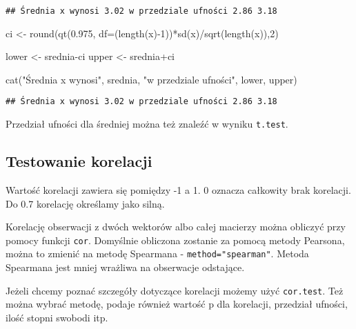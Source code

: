 \documentclass[
]{book}
\newenvironment{Shaded}{\begin{snugshade}}{\end{snugshade}}
\newcommand{\AttributeTok}[1]{\textcolor[rgb]{0.77,0.63,0.00}{#1}}
\newcommand{\DecValTok}[1]{\textcolor[rgb]{0.00,0.00,0.81}{#1}}
\newcommand{\FloatTok}[1]{\textcolor[rgb]{0.00,0.00,0.81}{#1}}
\newcommand{\FunctionTok}[1]{\textcolor[rgb]{0.00,0.00,0.00}{#1}}
\newcommand{\NormalTok}[1]{#1}
\newcommand{\OtherTok}[1]{\textcolor[rgb]{0.56,0.35,0.01}{#1}}
\newcommand{\SpecialCharTok}[1]{\textcolor[rgb]{0.00,0.00,0.00}{#1}}
\newcommand{\StringTok}[1]{\textcolor[rgb]{0.31,0.60,0.02}{#1}}
\begin{document}
\begin{verbatim}
## Średnia x wynosi 3.02 w przedziale ufności 2.86 3.18
\end{verbatim}

\begin{Shaded}
\begin{Highlighting}[]
\NormalTok{ci }\OtherTok{\textless{}{-}} \FunctionTok{round}\NormalTok{(}\FunctionTok{qt}\NormalTok{(}\FloatTok{0.975}\NormalTok{, }\AttributeTok{df=}\NormalTok{(}\FunctionTok{length}\NormalTok{(x)}\SpecialCharTok{{-}}\DecValTok{1}\NormalTok{))}\SpecialCharTok{*}\FunctionTok{sd}\NormalTok{(x)}\SpecialCharTok{/}\FunctionTok{sqrt}\NormalTok{(}\FunctionTok{length}\NormalTok{(x)),}\DecValTok{2}\NormalTok{)}

\NormalTok{lower }\OtherTok{\textless{}{-}}\NormalTok{ srednia}\SpecialCharTok{{-}}\NormalTok{ci}
\NormalTok{upper }\OtherTok{\textless{}{-}}\NormalTok{ srednia}\SpecialCharTok{+}\NormalTok{ci}

\FunctionTok{cat}\NormalTok{(}\StringTok{"Średnia x wynosi"}\NormalTok{, srednia, }\StringTok{"w przedziale ufności"}\NormalTok{, lower, upper)}
\end{Highlighting}
\end{Shaded}

\begin{verbatim}
## Średnia x wynosi 3.02 w przedziale ufności 2.86 3.18
\end{verbatim}

Przedział ufności dla średniej można też znaleźć w wyniku \texttt{t.test}.

\hypertarget{testowanie-korelacji}{%
\subsection{Testowanie korelacji}\label{testowanie-korelacji}}

Wartość korelacji zawiera się pomiędzy -1 a 1. 0 oznacza całkowity brak korelacji. Do 0.7 korelację określamy jako silną.

Korelację obserwacji z dwóch wektorów albo całej macierzy można obliczyć przy pomocy funkcji \texttt{cor}. Domyślnie obliczona zostanie za pomocą metody Pearsona, można to zmienić na metodę Spearmana - \texttt{method="spearman"}. Metoda Spearmana jest mniej wrażliwa na obserwacje odstające.

Jeżeli chcemy poznać szczegóły dotyczące korelacji możemy użyć \texttt{cor.test}. Też można wybrać metodę, podaje również wartość p dla korelacji, przedział ufności, ilość stopni swobodi itp.
\end{document}
